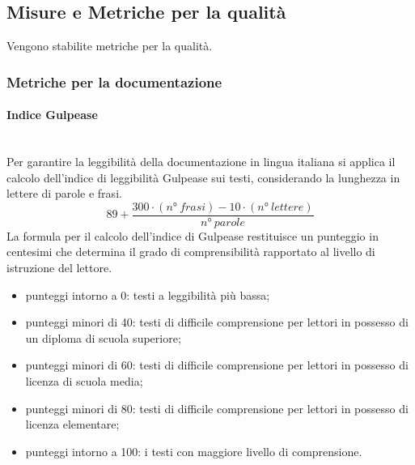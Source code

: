\subsection{Misure e Metriche per la qualità}
Vengono stabilite metriche per la qualità.

\subsubsection{Metriche per la documentazione}
\paragraph{Indice Gulpease}\mbox{}\\
Per garantire la leggibilità della documentazione in lingua italiana si applica il calcolo dell'indice di leggibilità Gulpease sui testi, considerando la lunghezza in lettere di parole e frasi.
\[ 89+\frac{300 \cdot \left(n°\ frasi\right)-10 \cdot \left(n°\ lettere\right)}{n°\ parole} \]
La formula per il calcolo dell'indice di Gulpease restituisce un punteggio in centesimi che determina il grado di comprensibilità rapportato al livello di istruzione del lettore.
\begin{itemize}
	\item punteggi intorno a 0: testi a leggibilità più bassa;
	\item punteggi minori di 40: testi di difficile comprensione per lettori in possesso di un diploma di scuola superiore;
	\item punteggi minori di 60: testi di difficile comprensione per lettori in possesso di licenza di scuola media;
	\item punteggi minori di 80: testi di difficile comprensione per lettori in possesso di licenza elementare;
	\item punteggi intorno a 100: i testi con maggiore livello di comprensione.
\end{itemize}

